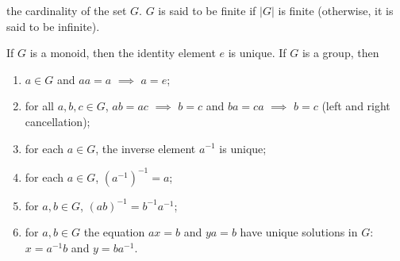 the cardinality of the set $G$. $G$ is said to be finite if $|G|$ is
finite (otherwise, it is said to be infinite).
\begin{theorem}[1.2]
If $G$ is a monoid, then the identity element $e$ is unique. If $G$ is a
group, then
\begin{enumerate}[label=\textnormal{(\alph*)}]
\item $a\in G$ and $aa=a$ $\implies$ $a=e$;
\item for all $a,b,c\in G$, $ab=ac$ $\implies$ $b=c$ and $ba=ca$ $\implies$
  $b=c$ (left and right cancellation);
\item for each $a\in G$, the inverse element $a^{-1}$ is unique;
\item for each $a\in G$, $\left( a^{-1} \right)^{-1}=a$;
\item for $a,b\in G$, $(ab)^{-1}=b^{-1}a^{-1}$;
\item for $a,b\in G$ the equation $ax=b$ and $ya=b$ have unique solutions
  in $G$: $x=a^{-1}b$ and $y=ba^{-1}$.
\end{enumerate}
\end{theorem}

